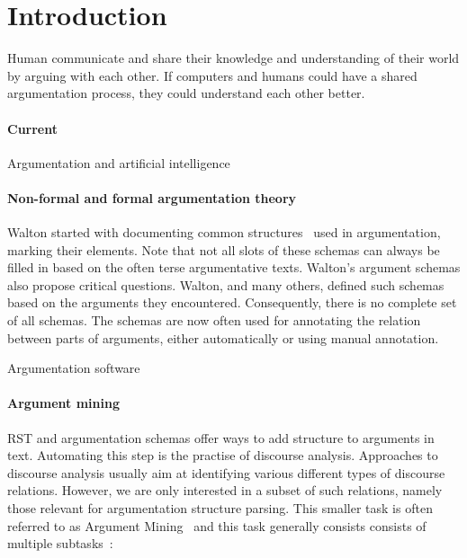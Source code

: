 \documentclass{IOS-Book-Article}
\begin{document}
\section{Introduction}
Human communicate and share their knowledge and understanding of their world by arguing with each other. If computers and humans could have a shared argumentation process, they could understand each other better.

\paragraph{Current}
Argumentation and artificial intelligence~\cite{vanEemerenEtal2014ch11}

\paragraph{Non-formal and formal argumentation theory}
\cite{vanEemerenEtal2014,vanEemerenVerheij2017}

Walton started with documenting common structures~\cite{waltonReedMacagno2008} used in argumentation, marking their elements. Note that not all slots of these schemas can always be filled in based on the often terse argumentative texts. Walton's argument schemas also propose critical questions. Walton, and many others, defined such schemas based on the arguments they encountered. Consequently, there is no complete set of all schemas. The schemas are now often used for annotating the relation between parts of arguments, either automatically or using manual annotation.

Argumentation software~\cite{kirschnerEtal2003,verheij2007,scheuerEtal2010,noroozi2012argumentation}

\paragraph{Argument mining}
\cite{moens2017,peldszus2013argument,lippi2016argumentation,mochales2011argumentation}

RST and argumentation schemas offer ways to add structure to arguments in text. Automating this step is the practise of discourse analysis. Approaches to discourse analysis usually aim at identifying various different types of discourse relations. However, we are only interested in a subset of such relations, namely those relevant for argumentation structure parsing. This smaller task is often referred to as Argument Mining~\cite{stabGurevych2017} and this task generally consists consists of multiple subtasks~\cite{lippi2016argumentation}:
\end{document}
